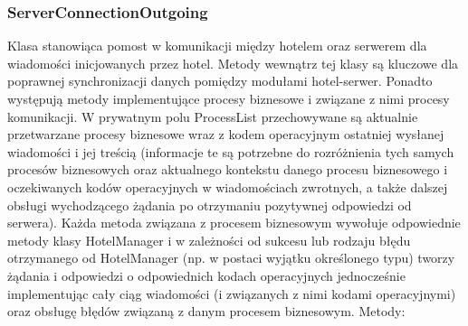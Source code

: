 \documentclass{article}
\begin{document}
\subsubsection{ServerConnectionOutgoing}
Klasa stanowiąca pomost w komunikacji między hotelem oraz serwerem dla wiadomości inicjowanych przez hotel. Metody wewnątrz tej klasy są kluczowe dla poprawnej synchronizacji danych pomiędzy modułami hotel-serwer. Ponadto występują metody implementujące procesy biznesowe i związane z nimi procesy komunikacji. W prywatnym polu ProcessList przechowywane są aktualnie przetwarzane procesy biznesowe wraz z kodem operacyjnym ostatniej wysłanej wiadomości i jej treścią (informacje te są potrzebne do rozróżnienia tych samych procesów biznesowych oraz aktualnego kontekstu danego procesu biznesowego i oczekiwanych kodów operacyjnych w wiadomościach zwrotnych, a także dalszej obsługi wychodzącego żądania po otrzymaniu pozytywnej odpowiedzi od serwera). Każda metoda związana z procesem biznesowym wywołuje odpowiednie metody klasy HotelManager i w zależności od sukcesu lub rodzaju błędu otrzymanego od HotelManager (np. w postaci wyjątku określonego typu) tworzy żądania i odpowiedzi o odpowiednich kodach operacyjnych jednocześnie implementując cały ciąg wiadomości (i związanych z nimi kodami operacyjnymi) oraz obsługę błędów związaną z danym procesem biznesowym. Metody:
\end{document}
